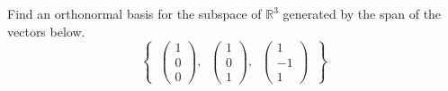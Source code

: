 \documentclass[12pt,letterpaper]{exam}
\begin{document}
\begin{questions}
\newpage
\question[10] Find an orthonormal basis for the subspace of $\mathbb{R}^3$ generated by the span of the vectors below.
	\[
	\left\{ \;\; \begin{pmatrix} 1 \\ 0 \\ 0 \end{pmatrix}, \;\; \begin{pmatrix} 1 \\ 0 \\ 1 \end{pmatrix}, \;\; \begin{pmatrix} 1 \\ -1 \\ 1 \end{pmatrix} \;\; \right\}
	\] \par\vspace{0.3cm}


\end{questions}
\end{document}
